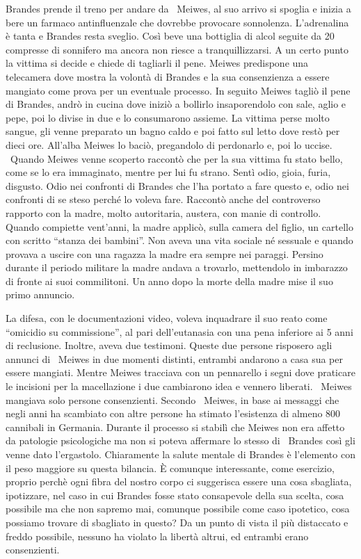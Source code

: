 \documentclass[12pt]{book} %
\begin{document}
Brandes prende il treno per andare da \ Meiwes, al suo arrivo si spoglia e inizia a bere un farmaco antinfluenzale che
dovrebbe provocare sonnolenza. L'adrenalina è tanta e Brandes resta sveglio. Così beve una
bottiglia di alcol seguite da 20 compresse di sonnifero ma ancora non riesce a tranquillizzarsi. A un certo punto la
vittima si decide e chiede di tagliarli il pene. Meiwes predispone una telecamera dove mostra la volontà di Brandes e
la sua consenzienza a essere mangiato come prova per un eventuale processo. In seguito Meiwes tagliò il pene di
Brandes, andrò in cucina dove iniziò a bollirlo insaporendolo con sale, aglio e pepe, poi lo divise in due e lo
consumarono assieme. La vittima perse molto sangue, gli venne preparato un bagno caldo e poi fatto sul letto dove restò
per dieci ore. All'alba Meiwes lo baciò, pregandolo di perdonarlo e, poi lo uccise. \ Quando
Meiwes venne scoperto raccontò che per la sua vittima fu stato bello, come se lo era immaginato, mentre per lui fu
strano. Sentì odio, gioia, furia, disgusto. Odio nei confronti di Brandes che l'ha portato a fare
questo e, odio nei confronti di se steso perché lo voleva fare. Raccontò anche del controverso rapporto con la madre,
molto autoritaria, austera, con manie di controllo. Quando compiette vent'anni, la madre applicò,
sulla camera del figlio, un cartello con scritto “stanza dei bambini”. Non aveva una vita sociale né sessuale e quando
provava a uscire con una ragazza la madre era sempre nei paraggi. Persino durante il periodo militare la madre andava a
trovarlo, mettendolo in imbarazzo di fronte ai suoi commilitoni. Un anno dopo la morte della madre mise il suo primo
annuncio.

La difesa, con le documentazioni video, voleva inquadrare il suo reato come “omicidio su commissione”, al pari
dell'eutanasia con una pena inferiore ai 5 anni di reclusione. Inoltre, aveva due testimoni.
Queste due persone risposero agli annunci di \ Meiwes in due momenti distinti, entrambi andarono a casa sua per essere
mangiati. Mentre Meiwes tracciava con un pennarello i segni dove praticare le incisioni per la macellazione i due
cambiarono idea e vennero liberati. \ Meiwes mangiava solo persone consenzienti. Secondo \ Meiwes, in base ai messaggi
che negli anni ha scambiato con altre persone ha stimato l'esistenza di almeno 800 cannibali in
Germania. Durante il processo si stabilì che Meiwes non era affetto da patologie psicologiche ma non si poteva
affermare lo stesso di \ Brandes così gli venne dato l'ergastolo. Chiaramente la salute mentale di
Brandes è l'elemento con il peso maggiore su questa bilancia. È comunque interessante, come
esercizio, proprio perchè ogni fibra del nostro corpo ci suggerisca essere una cosa sbagliata, ipotizzare, nel caso in
cui Brandes fosse stato consapevole della sua scelta, cosa possibile ma che non sapremo mai, comunque possibile come
caso ipotetico, cosa possiamo trovare di sbagliato in questo? Da un punto di vista il più distaccato e freddo
possibile, nessuno ha violato la libertà altrui, ed entrambi erano consenzienti.
\end{document}
